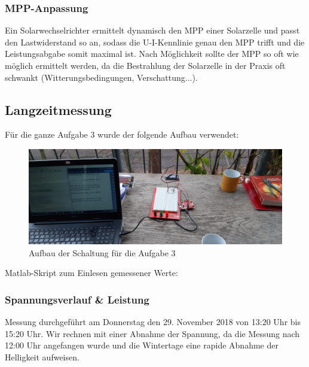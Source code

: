 \subsubsection{MPP-Anpassung}

Ein Solarwechselrichter ermittelt dynamisch den MPP einer Solarzelle und passt den Lastwiderstand so an, sodass die U-I-Kennlinie genau den MPP trifft und die Leistungsabgabe somit maximal ist.
Nach Möglichkeit sollte der MPP so oft wie möglich ermittelt werden, da die Bestrahlung der Solarzelle in der Praxis oft schwankt (Witterungsbedingungen, Verschattung...). \cite{Fachkundebuch}

\clearpage
\subsection{Langzeitmessung}

Für die ganze Aufgabe 3 wurde der folgende Aufbau verwendet:

\begin{figure}[htb]
\centering
\includegraphics[width=16cm]{pictures/Dokumentation/Schaltung-2.jpeg}
\caption{Aufbau der Schaltung für die Aufgabe 3}
\label{fig:Schaltung3}
\end{figure}

Matlab-Skript zum Einlesen gemessener Werte:


\clearpage
\subsubsection{Spannungsverlauf \& Leistung}


Messung durchgeführt am Donnerstag den 29. November 2018 von 13:20 Uhr bis 15:20 Uhr.
Wir rechnen mit einer Abnahme der Spannung, da die Messung nach 12:00 Uhr angefangen wurde und die Wintertage eine rapide Abnahme der Helligkeit aufweisen.


